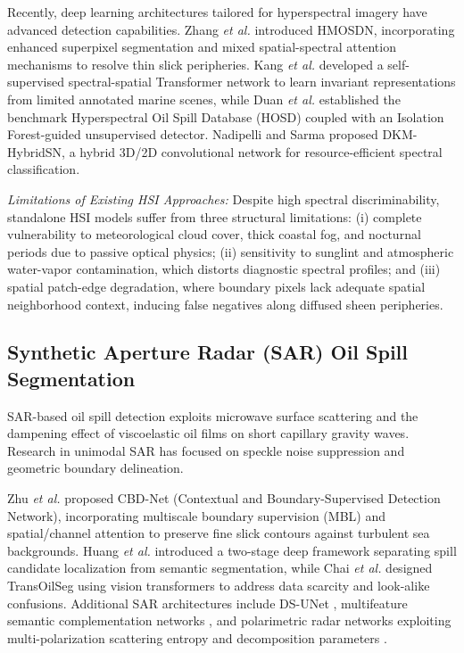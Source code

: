 \documentclass[conference]{IEEEtran}
\begin{document}
Recently, deep learning architectures tailored for hyperspectral imagery have advanced detection capabilities. Zhang \textit{et al.} \cite{zhang2025hyperspectral} introduced HMOSDN, incorporating enhanced superpixel segmentation and mixed spatial-spectral attention mechanisms to resolve thin slick peripheries. Kang \textit{et al.} \cite{kang2023selfsupervised} developed a self-supervised spectral-spatial Transformer network to learn invariant representations from limited annotated marine scenes, while Duan \textit{et al.} \cite{duan2023hosd} established the benchmark Hyperspectral Oil Spill Database (HOSD) coupled with an Isolation Forest-guided unsupervised detector. Nadipelli and Sarma \cite{nadipelli2022dkm} proposed DKM-HybridSN, a hybrid 3D/2D convolutional network for resource-efficient spectral classification. 

\textit{Limitations of Existing HSI Approaches:} Despite high spectral discriminability, standalone HSI models suffer from three structural limitations: (i) complete vulnerability to meteorological cloud cover, thick coastal fog, and nocturnal periods due to passive optical physics; (ii) sensitivity to sunglint and atmospheric water-vapor contamination, which distorts diagnostic spectral profiles; and (iii) spatial patch-edge degradation, where boundary pixels lack adequate spatial neighborhood context, inducing false negatives along diffused sheen peripheries.

\subsection{Synthetic Aperture Radar (SAR) Oil Spill Segmentation}
SAR-based oil spill detection exploits microwave surface scattering and the dampening effect of viscoelastic oil films on short capillary gravity waves. Research in unimodal SAR has focused on speckle noise suppression and geometric boundary delineation.

Zhu \textit{et al.} \cite{zhu2022oil} proposed CBD-Net (Contextual and Boundary-Supervised Detection Network), incorporating multiscale boundary supervision (MBL) and spatial/channel attention to preserve fine slick contours against turbulent sea backgrounds. Huang \textit{et al.} \cite{huang2025twostage} introduced a two-stage deep framework separating spill candidate localization from semantic segmentation, while Chai \textit{et al.} \cite{chai2025transoilseg} designed TransOilSeg using vision transformers to address data scarcity and look-alike confusions. Additional SAR architectures include DS-UNet \cite{li2023dsunet}, multifeature semantic complementation networks \cite{fan2023multifeature}, and polarimetric radar networks exploiting multi-polarization scattering entropy and decomposition parameters \cite{jamal2025cwcm, ma2022polarimetric, xiang2025polsar}.
\end{document}
